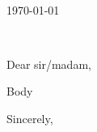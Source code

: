 \documentclass[10pt,a4paper]{letter} %
\def\opening#1{\thispagestyle{empty}
{\centering\fromaddress \vspace{0.6in} \\ %
\hspace*{0.8\longindentation}\today\hspace*{\fill}\par} %
{\raggedright \toname \\ \toaddress \par} %
\vspace{0.4in} %
\noindent #1 %
}
\begin{document}

\begin{letter}


\opening{Dear sir/madam,}

Body

\closing{Sincerely,}





\end{letter}
\end{document}
